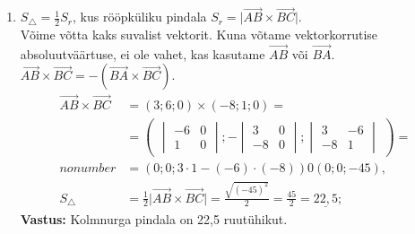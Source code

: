 \documentclass[10pt, a4paper]{article}
\begin{document}
\begin{enumerate}
            \item
                $S_\triangle = \frac{1}{2}S_{r}$, kus rööpküliku pindala $S_{r} = \lvert \vec{AB} \times \vec{BC} \rvert$.\\
                Võime võtta kaks suvalist vektorit. Kuna võtame vektorkorrutise absoluutväärtuse, ei ole vahet, kas kasutame $\vec{AB}$ või $\vec{BA}$. $\vec{AB} \times \vec{BC} = -(\vec{BA} \times \vec{BC})$.
                \begin{align}
                    \nonumber
                    \vec{AB} \times \vec{BC} &= (3; 6; 0) \times (-8; 1; 0) = \\ \nonumber
                    &= \begin{pmatrix}
                        \begin{vmatrix}
                        -6 & 0\\
                        1 & 0
                        \end{vmatrix};
                        -\begin{vmatrix}
                        3 & 0\\
                        -8 & 0
                        \end{vmatrix};
                        \begin{vmatrix}
                        3 & -6\\
                        -8 & 1
                        \end{vmatrix}
                    \end{pmatrix} =  \\nonumber
                    &= (0; 0; 3 \cdot 1 - (-6) \cdot (-8)) 0 (0; 0; -45),\\ \nonumber
                    S_\triangle &= \frac{1}{2}\lvert \vec{AB} \times \vec{BC} \rvert = \frac{\sqrt{(-45)^2}}{2} = \frac{45}{2} = \underline{22,5};
                \end{align}
                \textbf{Vastus: }Kolmnurga pindala on 22,5 ruutühikut.
        \end{enumerate}
        
\end{document}
